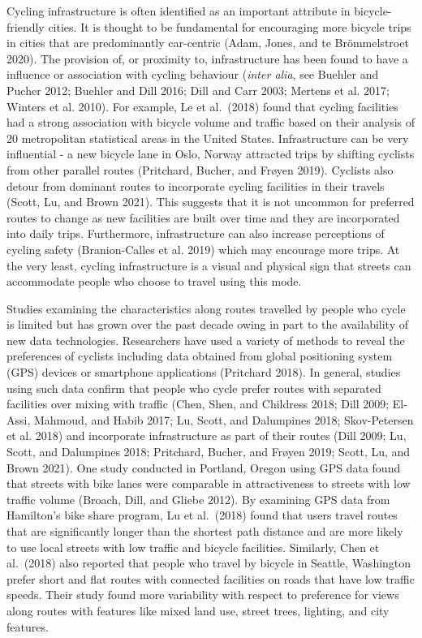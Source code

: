 \documentclass[smallextended]{svjour3}       %
\begin{document}
Cycling infrastructure is often identified as an important attribute in
bicycle-friendly cities. It is thought to be fundamental for encouraging
more bicycle trips in cities that are predominantly car-centric (Adam,
Jones, and te Brömmelstroet 2020). The provision of, or proximity to,
infrastructure has been found to have a influence or association with
cycling behaviour (\emph{inter alia}, see Buehler and Pucher 2012;
Buehler and Dill 2016; Dill and Carr 2003; Mertens et al. 2017; Winters
et al. 2010). For example, Le et al.~(2018) found that cycling
facilities had a strong association with bicycle volume and traffic
based on their analysis of 20 metropolitan statistical areas in the
United States. Infrastructure can be very influential - a new bicycle
lane in Oslo, Norway attracted trips by shifting cyclists from other
parallel routes (Pritchard, Bucher, and Frøyen 2019). Cyclists also
detour from dominant routes to incorporate cycling facilities in their
travels (Scott, Lu, and Brown 2021). This suggests that it is not
uncommon for preferred routes to change as new facilities are built over
time and they are incorporated into daily trips. Furthermore,
infrastructure can also increase perceptions of cycling safety
(Branion-Calles et al. 2019) which may encourage more trips. At the very
least, cycling infrastructure is a visual and physical sign that streets
can accommodate people who choose to travel using this mode.

Studies examining the characteristics along routes travelled by people
who cycle is limited but has grown over the past decade owing in part to
the availability of new data technologies. Researchers have used a
variety of methods to reveal the preferences of cyclists including data
obtained from global positioning system (GPS) devices or smartphone
applications (Pritchard 2018). In general, studies using such data
confirm that people who cycle prefer routes with separated facilities
over mixing with traffic (Chen, Shen, and Childress 2018; Dill 2009;
El-Assi, Mahmoud, and Habib 2017; Lu, Scott, and Dalumpines 2018;
Skov-Petersen et al. 2018) and incorporate infrastructure as part of
their routes (Dill 2009; Lu, Scott, and Dalumpines 2018; Pritchard,
Bucher, and Frøyen 2019; Scott, Lu, and Brown 2021). One study conducted
in Portland, Oregon using GPS data found that streets with bike lanes
were comparable in attractiveness to streets with low traffic volume
(Broach, Dill, and Gliebe 2012). By examining GPS data from Hamilton's
bike share program, Lu et al.~(2018) found that users travel routes that
are significantly longer than the shortest path distance and are more
likely to use local streets with low traffic and bicycle facilities.
Similarly, Chen et al.~(2018) also reported that people who travel by
bicycle in Seattle, Washington prefer short and flat routes with
connected facilities on roads that have low traffic speeds. Their study
found more variability with respect to preference for views along routes
with features like mixed land use, street trees, lighting, and city
features.
\end{document}
